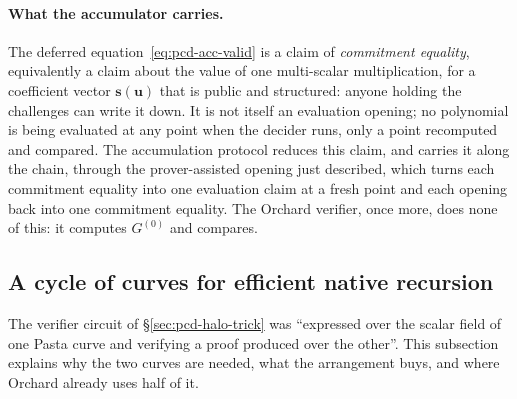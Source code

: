 \documentclass[11pt,a4paper]{article}
\theoremstyle{definition}
\begin{document}
\paragraph{What the accumulator carries.}
The deferred equation~\eqref{eq:pcd-acc-valid} is a claim of
\emph{commitment equality}, equivalently a claim about the value of one
multi-scalar multiplication, for a coefficient vector
$\mathbf s(\mathbf u)$ that is public and structured: anyone holding
the challenges can write it down. It is not itself an evaluation
opening; no polynomial is being evaluated at any point when the decider
runs, only a point recomputed and compared. The accumulation protocol
reduces this claim, and carries it along the chain, through the
prover-assisted opening just described, which turns each commitment
equality into one evaluation claim at a fresh point and each opening
back into one commitment equality. The Orchard verifier, once more,
does none of this: it computes $G^{(0)}$ and compares.

\subsection{A cycle of curves for efficient native recursion}
\label{sec:pcd-cycle}

The verifier circuit of \S\ref{sec:pcd-halo-trick} was ``expressed over
the scalar field of one Pasta curve and verifying a proof produced over
the other''. This subsection explains why the two curves are needed,
what the arrangement buys, and where Orchard already uses half of it.
\end{document}
